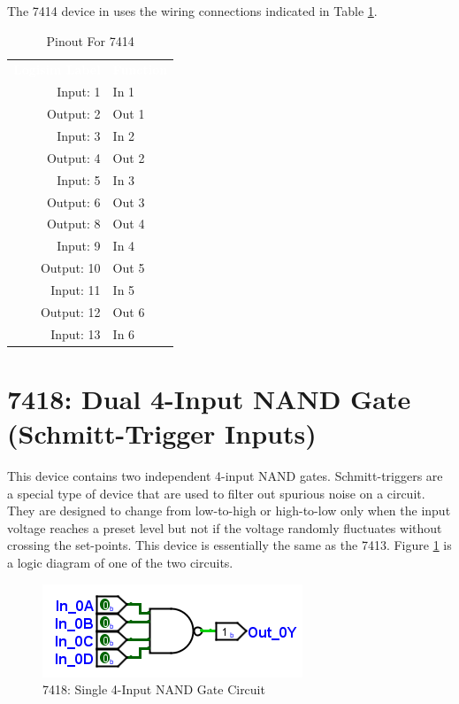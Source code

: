 The 7414 device in \LE uses the wiring connections indicated in Table \ref{tab:50-7414}.

\begin{table}[H]
	\sffamily
	\newcommand{\head}[1]{\textcolor{white}{\textbf{#1}}}		
	\begin{center}
		\begin{tabular}{rl} 
			\rowcolor{black!75}
			\head{Logisim Label} & \head{Function} \\
			Input: 1   & In 1  \\
			Output: 2  & Out 1  \\
			Input: 3   & In 2 \\
			Output: 4  & Out 2  \\
			Input: 5   & In 3  \\
			Output: 6  & Out 3 \\
			Output: 8  & Out 4  \\
			Input: 9   & In 4  \\
			Output: 10 & Out 5  \\
			Input: 11  & In 5  \\
			Output: 12 & Out 6 \\
			Input: 13  & In 6  \\
		\end{tabular}
	\end{center}
	\caption{Pinout For 7414}
	\label{tab:50-7414}
\end{table}

\section{7418: Dual 4-Input NAND Gate (Schmitt-Trigger Inputs)}

This device contains two independent 4-input NAND gates. Schmitt-triggers are a special type of device that are used to filter out spurious noise on a circuit. They are designed to change from low-to-high or high-to-low only when the input voltage reaches a preset level but not if the voltage randomly fluctuates without crossing the set-points. This device is essentially the same as the 7413. Figure \ref{fig:app_ttl-7418} is a logic diagram of one of the two circuits.

\begin{figure}[H]
	\centering
	\includegraphics{gfx/app_ttl-7413}
	\caption{7418: Single 4-Input NAND Gate Circuit}
	\label{fig:app_ttl-7418}
\end{figure}

